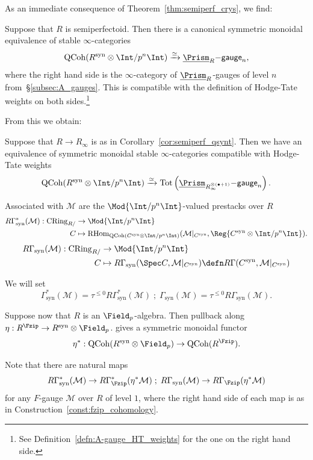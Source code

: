 \documentclass[10pt]{amsart}
\begin{document}
As an immediate consequence of Theorem~\ref{thm:semiperf_crys}, we find:
\begin{proposition}
\label{prop:semiperfect_f-gauges}
Suppose that $R$ is semiperfectoid. Then there is a canonical symmetric monoidal equivalence of stable $\infty$-categories
\[
\mathrm{QCoh}(R^{\mathrm{syn}}\otimes\Int/p^n\Int)\xrightarrow{\simeq}\underline{\Prism}_R\mathsf{-gauge}_n,
\] 
where the right hand side is the $\infty$-category of $\underline{\Prism}_R$-gauges of level $n$ from~\S\ref{subsec:A_gauges}. This is compatible with the definition of Hodge-Tate weights on both sides.\footnote{See Definition~\ref{defn:A-gauge_HT_weights} for the one on the right hand side.}
\end{proposition}

From this we obtain:
\begin{proposition}
\label{prop:f_gauges_descent}
Suppose that $R\to R_\infty$ is as in Corollary~\ref{cor:semiperf_qsynt}. Then we have an equivalence of symmetric monoidal stable $\infty$-categories compatible with Hodge-Tate weights
\[
\mathrm{QCoh}(R^{\mathrm{syn}}\otimes\Int/p^n\Int)\xrightarrow{\simeq}\mathrm{Tot}\left(\underline{\Prism}_{R_\infty^{\otimes(\bullet +1)}}\mathsf{-gauge}_n\right).
\]
\end{proposition}

\begin{construction}
\label{const:syn_cohom_f-gauge}
Associated with $\mathcal{M}$ are the $\Mod{\Int/p^n\Int}$-valued prestacks over $R$
\begin{align*}
R\Gamma^*_{\mathrm{syn}}(\mathcal{M}):\mathrm{CRing}_{R/}&\to \Mod{\Int/p^n\Int}\\
C&\mapsto \mathrm{RHom}_{\mathrm{QCoh}(C^{\mathrm{syn}}\otimes\Int/p^n\Int)}(\mathcal{M}\vert_{C^\mathrm{syn}},\Reg{C^{\mathrm{syn}}\otimes\Int/p^n\Int}).
\end{align*}
\begin{align*}
R\Gamma_{\mathrm{syn}}(\mathcal{M}):\mathrm{CRing}_{R/}&\to \Mod{\Int/p^n\Int}\\
C&\mapsto R\Gamma_{\mathrm{syn}}(\Spec C,\mathcal{M}\vert_{C^\mathrm{syn}}) \defn R\Gamma(C^{\mathrm{syn}},\mathcal{M}\vert_{C^\mathrm{syn}})
\end{align*}

We will set 
\[
\Gamma_{\mathrm{syn}}^*(\mathcal{M}) = \tau^{\leq 0}R\Gamma^*_{\mathrm{syn}}(\mathcal{M})\;;\; \Gamma_{\mathrm{syn}}(\mathcal{M}) = \tau^{\leq 0}R\Gamma_{\mathrm{syn}}(\mathcal{M}).
\]


Suppose now that $R$ is an $\Field_p$-algebra. Then pullback along $\eta:R^{\Fzip}\to R^{\mathrm{syn}}\otimes\Field_p$. gives a symmetric monoidal functor
\[
\eta^*:\mathrm{QCoh}(R^{\mathrm{syn}}\otimes\Field_p)\to \mathrm{QCoh}(R^{\Fzip}).
\]

Note that there are natural maps
\[
R\Gamma^*_{\mathrm{syn}}(\mathcal{M})\to R\Gamma^*_{\Fzip}(\eta^* \mathcal{M})\;;\;R\Gamma_{\mathrm{syn}}(\mathcal{M})\to R\Gamma_{\Fzip}(\eta^* \mathcal{M})
\]
for any $F$-gauge $\mathcal{M}$ over $R$ of level $1$, where the right hand side of each map is as in Construction~\ref{const:fzip_cohomology}.
\end{construction}
\end{document}
